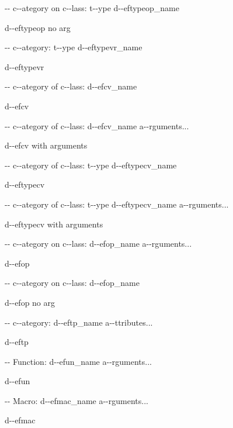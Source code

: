 \documentclass{book}
\begin{document}
\hbox{}{-}{-} c{-}{-}ategory on c{-}{-}lass: t{-}{-}ype d{-}{-}eftypeop\_name


%
d{-}{-}eftypeop no arg

\hbox{}{-}{-} c{-}{-}ategory: t{-}{-}ype d{-}{-}eftypevr\_name


%
d{-}{-}eftypevr

\hbox{}{-}{-} c{-}{-}ategory of c{-}{-}lass: d{-}{-}efcv\_name


%
d{-}{-}efcv

\hbox{}{-}{-} c{-}{-}ategory of c{-}{-}lass: d{-}{-}efcv\_name a{-}{-}rguments...


%
d{-}{-}efcv with arguments

\hbox{}{-}{-} c{-}{-}ategory of c{-}{-}lass: t{-}{-}ype d{-}{-}eftypecv\_name


%
d{-}{-}eftypecv

\hbox{}{-}{-} c{-}{-}ategory of c{-}{-}lass: t{-}{-}ype d{-}{-}eftypecv\_name a{-}{-}rguments...


%
d{-}{-}eftypecv with arguments

\hbox{}{-}{-} c{-}{-}ategory on c{-}{-}lass: d{-}{-}efop\_name a{-}{-}rguments...


%
d{-}{-}efop

\hbox{}{-}{-} c{-}{-}ategory on c{-}{-}lass: d{-}{-}efop\_name


%
d{-}{-}efop no arg

\hbox{}{-}{-} c{-}{-}ategory: d{-}{-}eftp\_name a{-}{-}ttributes...


%
d{-}{-}eftp

\hbox{}{-}{-} Function: d{-}{-}efun\_name a{-}{-}rguments...


%
d{-}{-}efun

\hbox{}{-}{-} Macro: d{-}{-}efmac\_name a{-}{-}rguments...


%
d{-}{-}efmac
\end{document}
